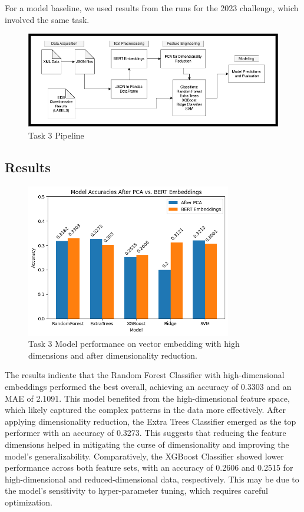 \documentclass[]{style/ceurart}
\begin{document}
For a model baseline, we used results from the runs for the 2023 challenge, which involved the same task.

\begin{figure}[h]
\centering
\includegraphics[width=\textwidth]{Task3Pipeline.png}
\caption{Task 3 Pipeline}
\label{fig:example}
\end{figure}

\newpage
\subsection{Results}

\begin{figure}[h]
\centering
\includegraphics[width=0.8\textwidth]{task3ModelRes.png}
\caption{Task 3 Model performance on vector embedding with high dimensions and after dimensionality reduction.}
\label{fig:example}
\end{figure}

The results indicate that the Random Forest Classifier with high-dimensional embeddings performed the best overall, achieving an accuracy of 0.3303 and an MAE of 2.1091. This model benefited from the high-dimensional feature space, which likely captured the complex patterns in the data more effectively.
After applying dimensionality reduction, the Extra Trees Classifier emerged as the top performer with an accuracy of 0.3273. 
This suggests that reducing the feature dimensions helped in mitigating the curse of dimensionality and improving the model's generalizability.
Comparatively, the XGBoost Classifier showed lower performance across both feature sets, with an accuracy of 0.2606 and 0.2515 for high-dimensional and reduced-dimensional data, respectively. 
This may be due to the model's sensitivity to hyper-parameter tuning, which requires careful optimization.
\end{document}

